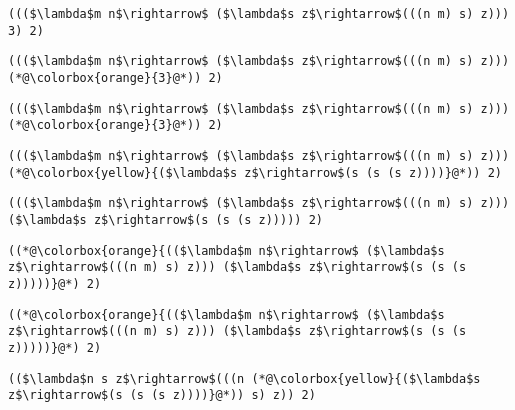 \documentclass{beamer}
\begin{document}
\begin{frame}[fragile]{\CurrentSection}
\lstset{basicstyle=\ttfamily\small}\lstset{numbers=none}\lstset{language=ML}\begin{lstlisting}
((($\lambda$m n$\rightarrow$ ($\lambda$s z$\rightarrow$(((n m) s) z))) 3) 2)
\end{lstlisting}
\pause\lstset{language=ML}\begin{lstlisting}
((($\lambda$m n$\rightarrow$ ($\lambda$s z$\rightarrow$(((n m) s) z))) (*@\colorbox{orange}{3}@*)) 2)
\end{lstlisting}

\end{frame}

\begin{frame}[fragile]{\CurrentSection}
\lstset{basicstyle=\ttfamily\small}\lstset{numbers=none}\lstset{language=ML}\begin{lstlisting}
((($\lambda$m n$\rightarrow$ ($\lambda$s z$\rightarrow$(((n m) s) z))) (*@\colorbox{orange}{3}@*)) 2)
\end{lstlisting}
\pause\lstset{language=ML}\begin{lstlisting}
((($\lambda$m n$\rightarrow$ ($\lambda$s z$\rightarrow$(((n m) s) z))) (*@\colorbox{yellow}{($\lambda$s z$\rightarrow$(s (s (s z))))}@*)) 2)
\end{lstlisting}

\end{frame}

\begin{frame}[fragile]{\CurrentSection}
\lstset{basicstyle=\ttfamily\small}\lstset{numbers=none}\lstset{language=ML}\begin{lstlisting}
((($\lambda$m n$\rightarrow$ ($\lambda$s z$\rightarrow$(((n m) s) z))) ($\lambda$s z$\rightarrow$(s (s (s z))))) 2)
\end{lstlisting}
\pause\lstset{language=ML}\begin{lstlisting}
((*@\colorbox{orange}{(($\lambda$m n$\rightarrow$ ($\lambda$s z$\rightarrow$(((n m) s) z))) ($\lambda$s z$\rightarrow$(s (s (s z)))))}@*) 2)
\end{lstlisting}

\end{frame}

\begin{frame}[fragile]{\CurrentSection}
\lstset{basicstyle=\ttfamily\small}\lstset{numbers=none}\lstset{language=ML}\begin{lstlisting}
((*@\colorbox{orange}{(($\lambda$m n$\rightarrow$ ($\lambda$s z$\rightarrow$(((n m) s) z))) ($\lambda$s z$\rightarrow$(s (s (s z)))))}@*) 2)
\end{lstlisting}
\pause\lstset{language=ML}\begin{lstlisting}
(($\lambda$n s z$\rightarrow$(((n (*@\colorbox{yellow}{($\lambda$s z$\rightarrow$(s (s (s z))))}@*)) s) z)) 2)
\end{lstlisting}

\end{frame}
\end{document}
